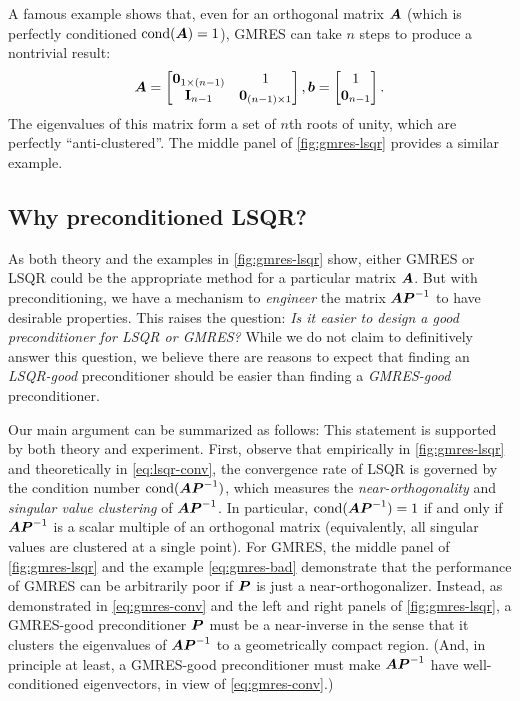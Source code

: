 \documentclass[onefignum,onetabnum,pagebackref,dvipsnames]{siamart220329}
\begin{document}
A famous example shows that, even for an orthogonal matrix $\boldsymbol{A}$ (which is perfectly conditioned $\operatorname{cond}(\boldsymbol{A}) = 1$), GMRES can take $n$ steps to produce a nontrivial result:
%
\begin{equation} \label{eq:gmres-bad}
    \boldsymbol{A} = \begin{bmatrix} \boldsymbol{0}_{1\times (n-1)} & 1 \\ \mathbf{I}_{n-1} & \boldsymbol{0}_{(n-1)\times 1} \end{bmatrix}, \boldsymbol{b} = \begin{bmatrix} 1 \\ \boldsymbol{0}_{n-1} \end{bmatrix}.
\end{equation}
%
The eigenvalues of this matrix form a set of $n$th roots of unity, which are perfectly ``anti-clustered''.
The middle panel of \cref{fig:gmres-lsqr} provides a similar example.

\subsection{Why preconditioned LSQR?\nopunct} \label{sec:why-preconditioned-lsqr}

As both theory and the examples in \cref{fig:gmres-lsqr} show, either GMRES or LSQR could be the appropriate method for a particular matrix $\boldsymbol{A}$.
But with preconditioning, we have a mechanism to \emph{engineer} the matrix $\boldsymbol{A}\boldsymbol{P}^{-1}$ to have desirable properties.
This raises the question: \emph{Is it easier to design a good preconditioner for LSQR or GMRES?}
While we do not claim to definitively answer this question, we believe there are reasons to expect that finding an \emph{LSQR-good} preconditioner should be easier than finding a \emph{GMRES-good} preconditioner.

Our main argument can be summarized as follows:
%
%
\noindent This statement is supported by both theory and experiment.
First, observe that empirically in \cref{fig:gmres-lsqr} and theoretically in \cref{eq:lsqr-conv}, the convergence rate of LSQR is governed by the condition number $\operatorname{cond}(\boldsymbol{A}\boldsymbol{P}^{-1})$, which measures the \emph{near-orthogonality} and \emph{singular value clustering} of $\boldsymbol{A}\boldsymbol{P}^{-1}$.
In particular, $\operatorname{cond}(\boldsymbol{A}\boldsymbol{P}^{-1}) = 1$ if and only if $\boldsymbol{A}\boldsymbol{P}^{-1}$ is a scalar multiple of an orthogonal matrix (equivalently, all singular values are clustered at a single point).
For GMRES, the middle panel of \cref{fig:gmres-lsqr} and the example \cref{eq:gmres-bad} demonstrate that the performance of GMRES can be arbitrarily poor if $\boldsymbol{P}$ is just a near-orthogonalizer.
Instead, as demonstrated in \cref{eq:gmres-conv} and the left and right panels of \cref{fig:gmres-lsqr}, a GMRES-good preconditioner $\boldsymbol{P}$ must be a near-inverse in the sense that it clusters the eigenvalues of $\boldsymbol{A}\boldsymbol{P}^{-1}$ to a geometrically compact region.
(And, in principle at least, a GMRES-good preconditioner must make $\boldsymbol{A}\boldsymbol{P}^{-1}$ have well-conditioned eigenvectors, in view of \cref{eq:gmres-conv}.)
\end{document}

